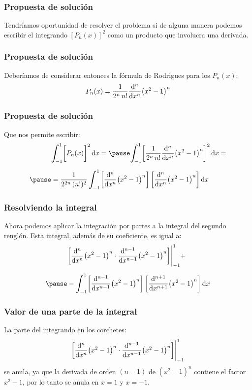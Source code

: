 \documentclass[12pt]{beamer}
\begin{document}
\begin{frame}
\frametitle{Propuesta de solución}
Tendríamos oportunidad de resolver el problema si de alguna manera podemos escribir el integrando $[P_{n} (x)]^{2}$ como un producto que involucra una derivada.
\end{frame}
\begin{frame}
\frametitle{Propuesta de solución}
Deberíamos de considerar entonces la fórmula de Rodrigues para los $P_{n} (x)$:
\pause
\begin{align*}
P_{n}(x) = \dfrac{1}{2^{n} \, n!} \dv[n]{x} (x^{2} - 1)^{n}
\end{align*}
\end{frame}
\begin{frame}
\frametitle{Propuesta de solución}
Que nos permite escribir:
\pause
\begin{eqnarray*}
\begin{aligned}
&\scaleint{6ex}_{\bs -1}^{1} \bigg[ P_{n}(x) \bigg]^{2} \dd{x} = \pause \scaleint{6ex}_{\bs -1}^{1} \bigg[ \dfrac{1}{2^{n} \, n!} \dv[n]{x} (x^{2} - 1)^{n} \bigg]^{2} \dd{x} = \\[0.5em] \pause
&= \dfrac{1}{2^{2n} \, (n!)^{2}} \, \scaleint{6ex}_{\bs -1}^{1} \bigg[ \dv[n]{x} (x^{2} - 1)^{n} \bigg] \, \bigg[ \dv[n]{x} (x^{2} - 1)^{n} \bigg] \dd{x}
\end{aligned}
\end{eqnarray*}
\end{frame}
\begin{frame}
\frametitle{Resolviendo la integral}
Ahora podemos aplicar la integración por partes a la integral del segundo renglón. \pause Esta integral, además de su coeficiente, es igual a:
\pause
\begin{eqnarray*}
\begin{aligned}
&\bigg[ \dv[n]{x} (x^{2} - 1)^{n} \cdot \dv[n-1]{x} (x^{2} - 1)^{n} \bigg] \Bigg\lvert_{-1}^{1} + \\[0.5em] \pause
&- \scaleint{6ex}_{\bs -1}^{1} \bigg[ \dv[n-1]{x} (x^{2} - 1)^{n} \bigg] \, \bigg[ \dv[n+1]{x} (x^{2} - 1)^{n} \bigg] \dd{x}
\end{aligned}
\end{eqnarray*}
\end{frame}
\begin{frame}
\frametitle{Valor de una parte de la integral}
La parte del integrando en los corchetes:
\pause
\begin{align*}
\bigg[ \dv[n]{x} (x^{2} - 1)^{n} \cdot \dv[n-1]{x} (x^{2} - 1)^{n} \bigg] \Bigg\lvert_{-1}^{1}
\end{align*}
se anula, \pause ya que la derivada de orden $(n - 1)$ de $(x^{2} - 1)^{n}$ contiene el factor $x^{2} - 1$, \pause por lo tanto se anula en $x = 1$ y $x = -1$.
\end{frame}
\end{document}
